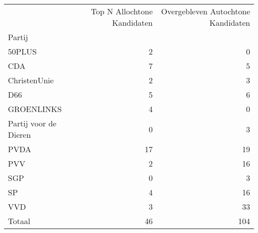 \begin{tabular}{lrr}
\toprule
{} &  Top N Allochtone Kandidaten &  Overgebleven Autochtone Kandidaten \\
Partij                &                              &                                     \\
\midrule
50PLUS                &                            2 &                                   0 \\
CDA                   &                            7 &                                   5 \\
ChristenUnie          &                            2 &                                   3 \\
D66                   &                            5 &                                   6 \\
GROENLINKS            &                            4 &                                   0 \\
Partij voor de Dieren &                            0 &                                   3 \\
PVDA                  &                           17 &                                  19 \\
PVV                   &                            2 &                                  16 \\
SGP                   &                            0 &                                   3 \\
SP                    &                            4 &                                  16 \\
VVD                   &                            3 &                                  33 \\
\midrule
Totaal                &                           46 &                                 104 \\
\bottomrule
\end{tabular}
